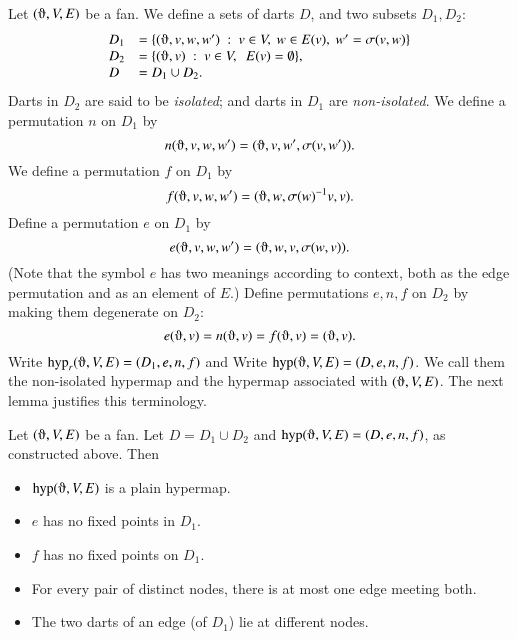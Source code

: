 Let $(\orgn,V,E)$ be a fan.  We define a sets of darts $D$, and
two subsets $D_1,D_2$:
    $$
    \begin{array}{lll}
    D_1 &= \{(\orgn,v,w,w')\mid v\in V,\ w\in E(v),\ w' = \sigma(v,w)\}\\
    D_2 &= \{(\orgn,v) \mid v\in V,\ \ E(v) = \emptyset\},\\
    D   &= D_1\cup D_2.
    \end{array}
    $$
Darts in $D_2$ are said to be {\it isolated}; and darts in $D_1$ are {\it non-isolated}.
%
We define a permutation $n$ on $D_1$ by
    $$n(\orgn,v,w,w') = (\orgn,v,w',\sigma(v,w')).$$
We define a permutation $f$ on $D_1$ by
    $$
    f (\orgn,v,w,w') = (\orgn,w,\sigma(w)^{-1} v,v).
    $$
Define a permutation $e$ on $D_1$ by
    $$
    e (\orgn,v,w,w') = (\orgn,w,v,\sigma(w,v)).
    $$
(Note that the symbol $e$ has two meanings according to context, both
as the edge permutation and as an element of $E$.)
Define permutations $e,n,f$ on $D_2$ by making them degenerate on $D_2$:
    $$
    e (\orgn,v) = n(\orgn,v) = f(\orgn,v) = (\orgn,v).
    $$
Write $\op{hyp}_r(\orgn,V,E)=(D_1,e,n,f)$ and
Write $\op{hyp}(\orgn,V,E)=(D,e,n,f)$.  We call them the non-isolated hypermap
and the hypermap associated with $(\orgn,V,E)$.  The next
lemma justifies this terminology.



\begin{lemma}
Let $(\orgn,V,E)$ be a fan.  Let $D = D_1\cup D_2$
and $\op{hyp}(\orgn,V,E) = (D,e,n,f)$, as constructed above.  Then
    \begin{itemize}
    \item $\op{hyp}(\orgn,V,E)$ is a plain hypermap.
    \item  $e$ has no fixed
points in $D_1$.
    \item  $f$ has no fixed points on $D_1$.
    \item For every pair of distinct nodes, there is at most one
    edge meeting both.
    \item The two darts of an edge (of $D_1$) lie at different nodes.
    \end{itemize}
\end{lemma}

